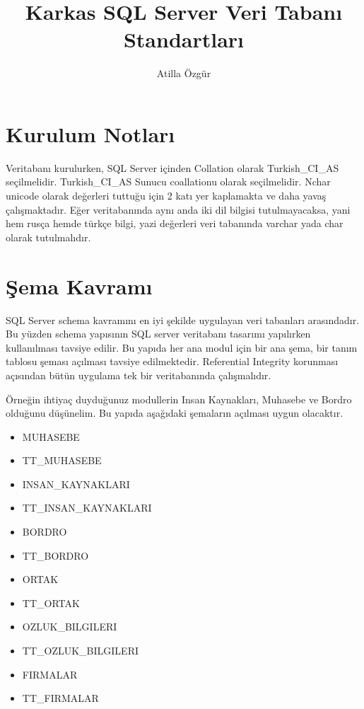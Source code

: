 \documentclass[10pt,a4paper,draft]{article}
\begin{document}
\author{Atilla Özgür}
\title{Karkas SQL Server Veri Tabanı Standartları}

\maketitle

\section{Kurulum Notları}
Veritabanı kurulurken, SQL Server içinden Collation olarak Turkish\_CI\_AS 
seçilmelidir. Turkish\_CI\_AS Sunucu coallationu olarak seçilmelidir. 
Nchar unicode olarak değerleri tuttuğu için 2 katı yer kaplamakta ve daha yavaş çalışmaktadır. 
Eğer veritabanında aynı anda iki dil bilgisi tutulmayacaksa, yani hem rusça hemde türkçe bilgi,
yazi değerleri veri tabanında  varchar yada char olarak tutulmalıdır.


\section{Şema Kavramı}


SQL Server schema kavramını en iyi şekilde uygulayan veri tabanları arasındadır.
Bu yüzden schema yapısının SQL server veritabanı tasarımı yapılırken kullanılması tavsiye edilir.
Bu yapıda her ana modul için bir ana şema, bir tanım tablosu şeması açılması tavsiye edilmektedir.
Referential  Integrity korunması açısından bütün uygulama tek bir veritabanında çalışmalıdır.

Örneğin ihtiyaç duyduğunuz modullerin Insan Kaynakları, Muhasebe ve Bordro olduğunu düşünelim. 
Bu yapıda aşağıdaki şemaların açılması uygun olacaktır.
\begin{itemize}
\item MUHASEBE
\item TT\_MUHASEBE
\item INSAN\_KAYNAKLARI
\item TT\_INSAN\_KAYNAKLARI
\item BORDRO
\item TT\_BORDRO
\item ORTAK
\item TT\_ORTAK
\item OZLUK\_BILGILERI
\item TT\_OZLUK\_BILGILERI
\item FIRMALAR
\item TT\_FIRMALAR

\end{itemize}
\end{document}
